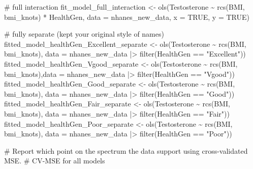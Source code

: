 \documentclass[
  letterpaper,
  DIV=11,
  numbers=noendperiod]{scrreprt}
\newenvironment{Shaded}{\begin{snugshade}}{\end{snugshade}}
\newcommand{\AttributeTok}[1]{\textcolor[rgb]{0.40,0.45,0.13}{#1}}
\newcommand{\CommentTok}[1]{\textcolor[rgb]{0.37,0.37,0.37}{#1}}
\newcommand{\ConstantTok}[1]{\textcolor[rgb]{0.56,0.35,0.01}{#1}}
\newcommand{\FunctionTok}[1]{\textcolor[rgb]{0.28,0.35,0.67}{#1}}
\newcommand{\NormalTok}[1]{\textcolor[rgb]{0.00,0.23,0.31}{#1}}
\newcommand{\OtherTok}[1]{\textcolor[rgb]{0.00,0.23,0.31}{#1}}
\newcommand{\SpecialCharTok}[1]{\textcolor[rgb]{0.37,0.37,0.37}{#1}}
\newcommand{\StringTok}[1]{\textcolor[rgb]{0.13,0.47,0.30}{#1}}
\begin{document}
{\begin{Shaded}
\begin{Highlighting}[]
\CommentTok{\# full interaction}
\NormalTok{fit\_model\_full\_interaction }\OtherTok{\textless{}{-}} \FunctionTok{ols}\NormalTok{(Testosterone }\SpecialCharTok{\textasciitilde{}} \FunctionTok{rcs}\NormalTok{(BMI, bmi\_knots) }\SpecialCharTok{*}\NormalTok{ HealthGen, }\AttributeTok{data =}\NormalTok{ nhanes\_new\_data, }\AttributeTok{x =} \ConstantTok{TRUE}\NormalTok{, }\AttributeTok{y =} \ConstantTok{TRUE}\NormalTok{)}

\CommentTok{\# fully separate (kept your original style of names)}
\NormalTok{fitted\_model\_healthGen\_Excellent\_separate }\OtherTok{\textless{}{-}} \FunctionTok{ols}\NormalTok{(Testosterone }\SpecialCharTok{\textasciitilde{}} \FunctionTok{rcs}\NormalTok{(BMI, bmi\_knots), }\AttributeTok{data =}\NormalTok{ nhanes\_new\_data }\SpecialCharTok{|\textgreater{}} \FunctionTok{filter}\NormalTok{(HealthGen }\SpecialCharTok{==} \StringTok{"Excellent"}\NormalTok{))}
\NormalTok{fitted\_model\_healthGen\_Vgood\_separate     }\OtherTok{\textless{}{-}} \FunctionTok{ols}\NormalTok{(Testosterone }\SpecialCharTok{\textasciitilde{}} \FunctionTok{rcs}\NormalTok{(BMI, bmi\_knots),}\AttributeTok{data =}\NormalTok{ nhanes\_new\_data }\SpecialCharTok{|\textgreater{}} \FunctionTok{filter}\NormalTok{(HealthGen }\SpecialCharTok{==} \StringTok{"Vgood"}\NormalTok{))}
\NormalTok{fitted\_model\_healthGen\_Good\_separate      }\OtherTok{\textless{}{-}} \FunctionTok{ols}\NormalTok{(Testosterone }\SpecialCharTok{\textasciitilde{}} \FunctionTok{rcs}\NormalTok{(BMI, bmi\_knots), }\AttributeTok{data =}\NormalTok{ nhanes\_new\_data }\SpecialCharTok{|\textgreater{}} \FunctionTok{filter}\NormalTok{(HealthGen }\SpecialCharTok{==} \StringTok{"Good"}\NormalTok{))}
\NormalTok{fitted\_model\_healthGen\_Fair\_separate      }\OtherTok{\textless{}{-}} \FunctionTok{ols}\NormalTok{(Testosterone }\SpecialCharTok{\textasciitilde{}} \FunctionTok{rcs}\NormalTok{(BMI, bmi\_knots), }\AttributeTok{data =}\NormalTok{ nhanes\_new\_data }\SpecialCharTok{|\textgreater{}} \FunctionTok{filter}\NormalTok{(HealthGen }\SpecialCharTok{==} \StringTok{"Fair"}\NormalTok{))}
\NormalTok{fitted\_model\_healthGen\_Poor\_separate }\OtherTok{\textless{}{-}} \FunctionTok{ols}\NormalTok{(Testosterone }\SpecialCharTok{\textasciitilde{}} \FunctionTok{rcs}\NormalTok{(BMI, bmi\_knots), }\AttributeTok{data =}\NormalTok{ nhanes\_new\_data }\SpecialCharTok{|\textgreater{}} \FunctionTok{filter}\NormalTok{(HealthGen }\SpecialCharTok{==} \StringTok{"Poor"}\NormalTok{))}

\CommentTok{\# Report which point on the spectrum the data support using cross{-}validated MSE.}
\CommentTok{\# CV{-}MSE for all models}


\end{Highlighting}
\end{Shaded}}
\end{document}
